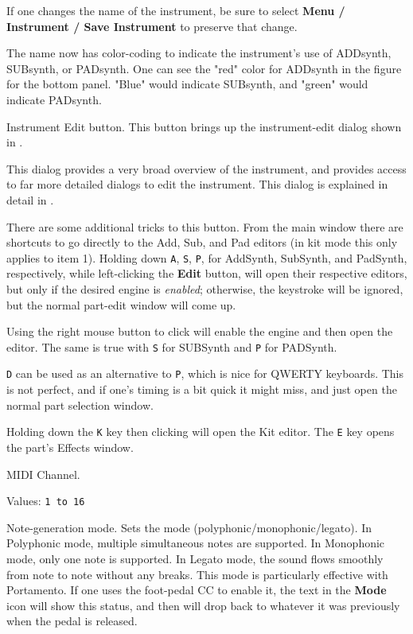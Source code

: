    If one changes the name of the instrument, be sure to select
   \textbf{Menu / Instrument / Save Instrument} to preserve that change.

   The name now has color-coding to indicate the instrument's use of
   ADDsynth, SUBsynth, or PADsynth.  One can see the "red" color for ADDsynth
   in the figure for the bottom panel.  "Blue" would indicate SUBsynth, and
   "green" would indicate PADsynth.

   Instrument Edit button.
   This button brings up the instrument-edit dialog shown in
   .

   This dialog provides a very broad overview of the instrument, and
   provides access to far more detailed dialogs to edit the instrument.
   This dialog is explained in detail in
   .

   There are some additional tricks to this button.
   From the main window there are shortcuts to go directly to the Add, Sub, and
   Pad editors (in kit mode this only applies to item 1).  Holding down
   \texttt{A},
   \texttt{S},
   \texttt{P}, for AddSynth, SubSynth, and PadSynth, respectively,
   while left-clicking the
   \textbf{Edit} button, will open their respective editors, but only if the
   desired engine is \textsl{enabled}; otherwise, the keystroke will be
   ignored, but the normal part-edit window will come up.

   Using the right mouse button to click will enable the engine and then open
   the editor.  The same is true with \texttt{S} for SUBSynth and \texttt{P}
   for PADSynth.

   \texttt{D} can be used as an alternative to
   \texttt{P}, which is nice for
   QWERTY keyboards.  This is not perfect, and if one's timing is a bit quick
   it might miss, and just open the normal part selection window.

   Holding down the \texttt{K} key then clicking will open
   the Kit editor.  The \texttt{E} key opens the part's Effects window.

   MIDI Channel.

   Values: \texttt{1 to 16}

   Note-generation mode.
   Sets the mode (polyphonic/monophonic/legato).
   In Polyphonic mode, multiple simultaneous notes are supported.
   In Monophonic mode, only one note is supported.
   In Legato mode, the sound flows smoothly from note to note without
   any breaks.  This mode is particularly effective with Portamento.
   If one uses the foot-pedal CC to enable it, the text in the
   \textbf{Mode} icon will show this status, and then will drop back to
   whatever it was previously when the pedal is released.

